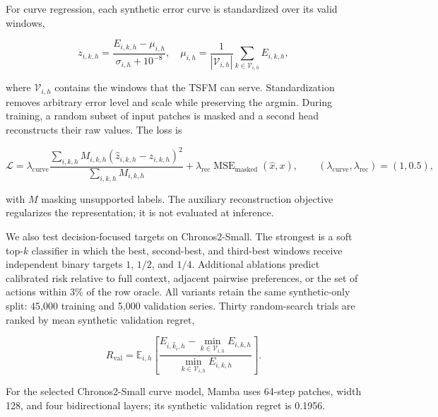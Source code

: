 For curve regression, each synthetic error curve is standardized over its
valid windows,

\begin{equation}
    z_{i,k,h}
      = \frac{E_{i,k,h}-\mu_{i,h}}
             {\sigma_{i,h}+10^{-8}},
    \quad
    \mu_{i,h}=\frac{1}{|\mathcal{V}_{i,h}|}
       \sum_{k\in\mathcal{V}_{i,h}}E_{i,k,h},
    \label{eq:curve-standardization}
\end{equation}

where $\mathcal{V}_{i,h}$ contains the windows that the TSFM can serve.
Standardization removes arbitrary error level and scale while preserving the
argmin.  During training, a random subset of input patches is masked and a
second head reconstructs their raw values.  The loss is

\begin{equation}
    \mathcal{L}
      = \lambda_{\mathrm{curve}}
          \frac{\sum_{i,k,h}M_{i,k,h}
          (\widehat z_{i,k,h}-z_{i,k,h})^2}
               {\sum_{i,k,h}M_{i,k,h}}
        + \lambda_{\mathrm{rec}}
          \operatorname{MSE}_{\mathrm{masked}}(\widehat x,x),
    \qquad
    (\lambda_{\mathrm{curve}},\lambda_{\mathrm{rec}})=(1,0.5),
    \label{eq:predictor-loss}
\end{equation}

with $M$ masking unsupported labels.  The auxiliary reconstruction objective
regularizes the representation; it is not evaluated at inference.

We also test decision-focused targets on Chronos2-Small.  The strongest is a
soft top-$k$ classifier in which the best, second-best, and third-best windows
receive independent binary targets $1$, $1/2$, and $1/4$.  Additional ablations
predict calibrated risk relative to full context, adjacent pairwise
preferences, or the set of actions within $3\%$ of the row oracle.  All
variants retain the same synthetic-only split: 45,000 training and 5,000
validation series.  Thirty random-search trials are ranked by mean synthetic
validation regret,

\begin{equation}
    R_{\mathrm{val}}
      = \mathbb{E}_{i,h}\left[
          \frac{E_{i,\widehat k_i,h}
                -\min_{k\in\mathcal{V}_{i,h}}E_{i,k,h}}
               {\min_{k\in\mathcal{V}_{i,h}}E_{i,k,h}}
        \right].
    \label{eq:synthetic-validation-regret}
\end{equation}

For the selected Chronos2-Small curve model, Mamba uses 64-step patches, width
128, and four bidirectional layers; its synthetic validation regret is 0.1956.

